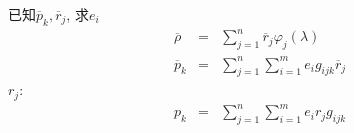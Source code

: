 \documentclass{beamer}
\newcommand{\nospace}{}
\begin{document}
{{\begin{frame}
  已知$\overline{p}_k, \overline{r}_j$, 求$e_i$
  \begin{eqnarray*}
    \overline{\rho} & = & \sum_{j = 1}^n \overline{r}_j \varphi_j (\lambda)\\
    \overline{p}_k & = & \sum_{j = 1}^n \sum_{i = 1}^m e_i g_{i \nospace j
    \nospace k} \overline{r}_j
  \end{eqnarray*}
  $r_j$:
  \begin{eqnarray*}
    p_k & = & \sum_{j = 1}^n \sum_{i = 1}^m e_i r_j g_{i \nospace j \nospace
    k}
  \end{eqnarray*}
\end{frame}}}
\end{document}
